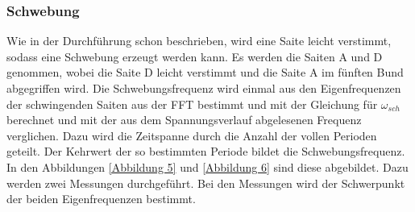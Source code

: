 \documentclass[a4paper, 11pt]{article}
\begin{document}
\subsubsection{Schwebung}
Wie in der Durchführung schon beschrieben, wird eine Saite leicht verstimmt, sodass eine Schwebung erzeugt werden kann. Es werden die Saiten A und D genommen, wobei die Saite D leicht verstimmt und die Saite A im fünften Bund abgegriffen wird. Die Schwebungsfrequenz wird einmal aus den Eigenfrequenzen der schwingenden Saiten aus der FFT bestimmt und mit der Gleichung für $\omega_{sch}$ berechnet und mit der aus dem Spannungsverlauf abgelesenen Frequenz verglichen. Dazu wird die Zeitspanne durch die Anzahl der vollen Perioden geteilt. Der Kehrwert der so bestimmten Periode bildet die Schwebungsfrequenz. In den Abbildungen \ref{Abbildung 5} und \ref{Abbildung 6} sind diese abgebildet. Dazu werden zwei Messungen durchgeführt. Bei den Messungen wird der Schwerpunkt der beiden  Eigenfrequenzen  bestimmt. 
\end{document}
